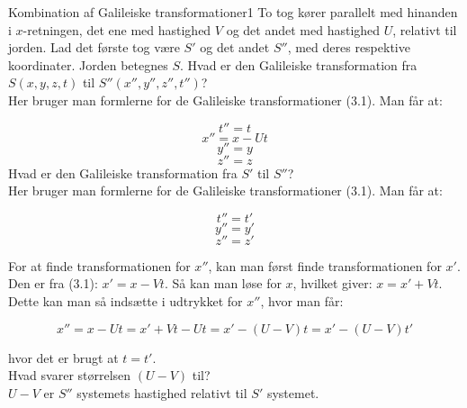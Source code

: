 \begin{opgave}{Kombination af Galileiske transformationer}{1}	
	To tog kører parallelt med hinanden i $x$-retningen, det ene med hastighed $V$ og det andet med hastighed $U$,
	relativt til jorden. Lad det første tog være $S'$ og det andet $S''$, med deres respektive koordinater. Jorden betegnes $S$.
	\opg Hvad er den Galileiske transformation fra $S \left( x,y,z,t \right)$ til $S'' \left( x'',y'',z'',t'' \right)$?\\
	
	Her bruger man formlerne for de Galileiske transformationer (3.1). Man får at:
	
	$$t''=t$$
	$$x''=x-Ut$$
	$$y''=y$$
	$$z''=z$$
	\opg Hvad er den Galileiske transformation fra $S'$ til $S''$?\\

	Her bruger man formlerne for de Galileiske transformationer (3.1). Man får at:
	
	$$t''=t'$$
	$$y''=y'$$
	$$z''=z'$$
	
	For at finde transformationen for $x''$, kan man først finde transformationen for $x'$. Den er fra (3.1): $x' = x - Vt $. Så kan man løse for $x$, hvilket giver: $x = x' + Vt$. Dette kan man så indsætte i udtrykket for $x''$, hvor man får:
	
	$$x'' = x-Ut = x' + Vt -Ut = x' - \left( U - V \right)t = x' - \left( U-V \right)t'$$
	
	hvor det er brugt at $t=t'$.\\
	\opg Hvad svarer størrelsen $\left( U- V \right)$ til?\\
	

	$U-V$ er $S''$ systemets hastighed relativt til $S'$ systemet.	 
\end{opgave}

